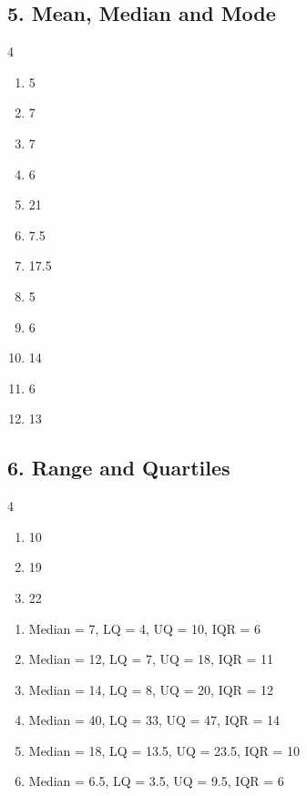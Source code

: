\documentclass[12pt,a4paper]{article}
\begin{document}
\subsection*{5. Mean, Median and Mode}
\begin{multicols}{4}\begin{enumerate}[nosep, label=\arabic*., start=1]
\item 5
\item 7
\item 7
\item 6
\item 21
\item 7.5
\item 17.5
\item 5
\item 6
\item 14
\item 6
\item 13
\end{enumerate}\end{multicols}

\subsection*{6. Range and Quartiles}
\begin{multicols}{4}\begin{enumerate}[nosep, label=\arabic*., start=1]
\item 10
\item 19
\item 22
\end{enumerate}\end{multicols}
\begin{enumerate}[nosep, label=\arabic*., start=4]
\item Median = 7, LQ = 4, UQ = 10, IQR = 6
\item Median = 12, LQ = 7, UQ = 18, IQR = 11
\item Median = 14, LQ = 8, UQ = 20, IQR = 12
\item Median = 40, LQ = 33, UQ = 47, IQR = 14
\item Median = 18, LQ = 13.5, UQ = 23.5, IQR = 10
\item Median = 6.5, LQ = 3.5, UQ = 9.5, IQR = 6
\end{enumerate}
\end{document}
